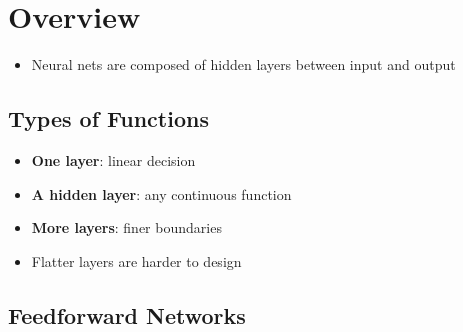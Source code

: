 \section{Overview}

  \begin{itemize}
    \item Neural nets are composed of hidden layers between input and output
  \end{itemize}

  \subsection{Types of Functions}

    \begin{itemize}
      \item \textbf{One layer}: linear decision
      \item \textbf{A hidden layer}: any continuous function
      \item \textbf{More layers}: finer boundaries
      \item Flatter layers are harder to design
    \end{itemize}

  \subsection{Feedforward Networks}